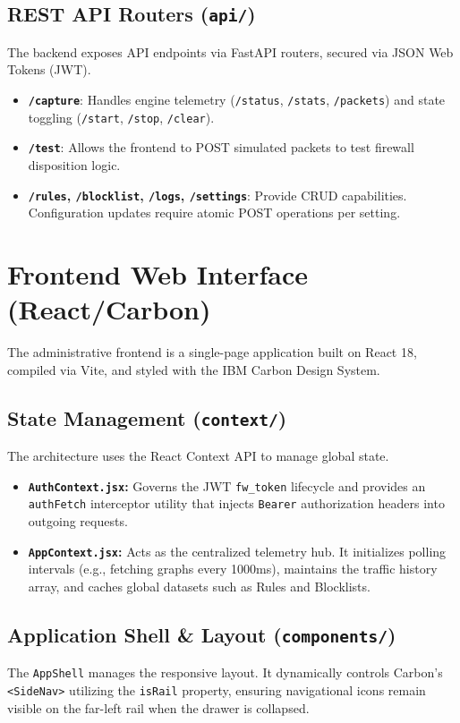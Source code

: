\documentclass[12pt, a4paper]{article}
\begin{document}
\subsection{REST API Routers (\texttt{api/})}
The backend exposes API endpoints via FastAPI routers, secured via JSON Web Tokens (JWT).
\begin{itemize}
    \item \textbf{\texttt{/capture}}: Handles engine telemetry (\texttt{/status}, \texttt{/stats}, \texttt{/packets}) and state toggling (\texttt{/start}, \texttt{/stop}, \texttt{/clear}).
    \item \textbf{\texttt{/test}}: Allows the frontend to POST simulated packets to test firewall disposition logic.
    \item \textbf{\texttt{/rules}, \texttt{/blocklist}, \texttt{/logs}, \texttt{/settings}}: Provide CRUD capabilities. Configuration updates require atomic POST operations per setting.
\end{itemize}

\section{Frontend Web Interface (React/Carbon)}
The administrative frontend is a single-page application built on React 18, compiled via Vite, and styled with the IBM Carbon Design System.

\subsection{State Management (\texttt{context/})}
The architecture uses the React Context API to manage global state.
\begin{itemize}
    \item \textbf{\texttt{AuthContext.jsx}:} Governs the JWT \texttt{fw\_token} lifecycle and provides an \texttt{authFetch} interceptor utility that injects \texttt{Bearer} authorization headers into outgoing requests.
    \item \textbf{\texttt{AppContext.jsx}:} Acts as the centralized telemetry hub. It initializes polling intervals (e.g., fetching graphs every 1000ms), maintains the traffic history array, and caches global datasets such as Rules and Blocklists.
\end{itemize}

\subsection{Application Shell \& Layout (\texttt{components/})}
The \texttt{AppShell} manages the responsive layout. It dynamically controls Carbon's \texttt{<SideNav>} utilizing the \texttt{isRail} property, ensuring navigational icons remain visible on the far-left rail when the drawer is collapsed.
\end{document}
